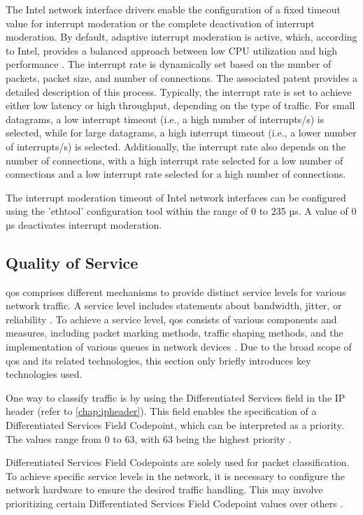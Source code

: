 The Intel network interface drivers enable the configuration of a fixed timeout value for interrupt moderation or the complete deactivation of interrupt moderation. By default, adaptive interrupt moderation is active, which, according to Intel, provides a balanced approach between low \ac{CPU} utilization and high performance \cite{intermod03}. The interrupt rate is dynamically set based on the number of packets, packet size, and number of connections. The associated patent \cite{intermod04} provides a detailed description of this process. Typically, the interrupt rate is set to achieve either low latency or high throughput, depending on the type of traffic. For small datagrams, a low interrupt timeout (i.e., a high number of interrupts/s) is selected, while for large datagrams, a high interrupt timeout (i.e., a lower number of interrupts/s) is selected. Additionally, the interrupt rate also depends on the number of connections, with a high interrupt rate selected for a low number of connections and a low interrupt rate selected for a high number of connections.

The interrupt moderation timeout of Intel network interfaces can be configured using the 'ethtool' configuration tool within the range of 0 to 235 µs. A value of 0 µs deactivates interrupt moderation.

\subsection{Quality of Service} \label{background:tuning:qualityofservice}
\acf{qos} comprises different mechanisms to provide distinct service levels for various network traffic. A service level includes statements about bandwidth, jitter, or reliability \cite{qos01}. To achieve a service level, \ac{qos} consists of various components and measures, including packet marking methods, traffic shaping methods, and the implementation of various queues in network devices \cite{qos02}. Due to the broad scope of \ac{qos} and its related technologies, this section only briefly introduces key technologies used.

One way to classify traffic is by using the Differentiated Services field in the IP header (refer to \ref{chap:ipheader}). This field enables the specification of a Differentiated Services Field Codepoint, which can be interpreted as a priority. The values range from 0 to 63, with 63 being the highest priority \cite{qos02}.

Differentiated Services Field Codepoints are solely used for packet classification. To achieve specific service levels in the network, it is necessary to configure the network hardware to ensure the desired traffic handling. This may involve prioritizing certain Differentiated Services Field Codepoint values over others \cite{qos02}.

